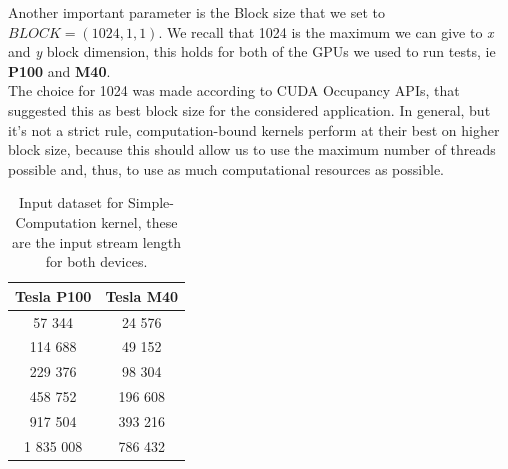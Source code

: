 Another important parameter is the Block size that we set to \(BLOCK = (1024, 1, 1)\). We recall that 1024 is the maximum we can give to \textit{x} and \textit{y} block dimension, this holds for both of the GPUs we used to run tests, ie \textbf{P100} and \textbf{M40}.\\
The choice for 1024 was made according to CUDA Occupancy APIs, that suggested this as best block size for the considered application. In general, but it's not a strict rule, computation-bound kernels perform at their best on higher block size, because this should allow us to use the maximum number of threads possible and, thus, to use as much computational resources as possible.\\
	\begin{table}	
		\centering
		\begin{tabular}{| c c |} 
			\hline
			\textbf{Tesla P100} & \textbf{Tesla M40} \\ [0.5ex] 
			\hline\hline
			
			57 344 & 24 576  \\ 
			\hline		
			114 688	& 49 152  \\ 
			\hline			
			229 376 & 98 304 \\
			\hline				
			458 752 & 196 608 \\
			\hline
			917 504 & 393 216 \\
			\hline
			1 835 008 & 786 432 \\
			\hline

		\end{tabular}
		\caption{Input dataset for Simple-Computation kernel, these are the input stream length for both devices.}	
		\label{tab:cosdata}		
	\end{table}

